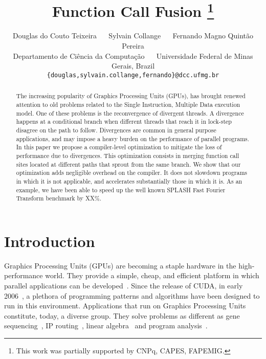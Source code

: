 \documentclass[times,10pt,twocolumn]{article}
\begin{document}
\title{Function Call Fusion
\thanks{This work was partially supported by CNPq, CAPES, FAPEMIG.}
}

\author{Douglas do Couto Teixeira ~~ Sylvain Collange ~~ Fernando Magno Quint\~{a}o Pereira\\
Departamento de Ci\^{e}ncia da Computa\c{c}\~{a}o ~~
Universidade Federal de Minas Gerais, Brazil\\
{\small {\tt \{douglas,sylvain.collange,fernando\}@dcc.ufmg.br}}
} 

\maketitle
\thispagestyle{empty}

\maketitle

\begin{abstract}
The increasing popularity of Graphics Processing Units (GPUs), has brought
renewed attention to old problems related to the Single Instruction, Multiple
Data execution model.
One of these problems is the reconvergence of divergent threads.
A divergence happens at a conditional branch when different threads that reach
it in lock-step disagree on the path to follow.
Divergences are common in general purpose applications, and may impose a heavy
burden on the performance of parallel programs.
In this paper we propose a compiler-level optimization to mitigate the loss of
performance due to divergences.
This optimization consists in merging function call sites located at different
paths that sprout from the same branch.
We show that our optimization adds negligible overhead on the compiler.
It does not slowdown programs in which it is not applicable, and accelerates
substantially those in which it is.
As an example, we have been able to speed up the well known SPLASH Fast Fourier
Transform benchmark by XX\%.
\end{abstract}


\section{Introduction}
\label{sec:int}

Graphics Processing Units (GPUs) are becoming a staple hardware in the
high-performance world.
They provide a simple, cheap, and efficient platform in which parallel
applications can be developed~\cite{Nickolls10}.
Since the release of CUDA, in early 2006~\cite{Garland08}, a plethora
of programming patterns and algorithms have been designed to run in this
environment.
Applications that run on Graphics Processing Units constitute, today, a diverse
group.
They solve problems as different as gene sequencing~\cite{Sandes10},
IP routing~\cite{Mu10}, linear algebra~\cite{Zhang10} and program
analysis~\cite{Prabhu11}.
\end{document}
